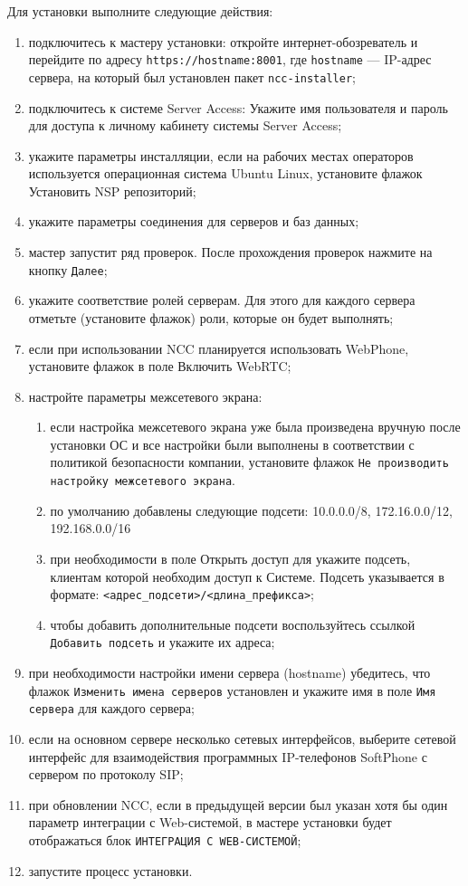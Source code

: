 Для установки выполните следующие действия:
\begin{enumerate}
    \item подключитесь к мастеру установки: откройте интернет-обозреватель и перейдите по адресу \texttt{https://hostname:8001}, где \texttt{hostname} — IP-адрес сервера, на который был установлен пакет \texttt{ncc-installer};
    \item подключитесь к системе Server Access: Укажите имя пользователя и пароль для доступа к личному кабинету системы Server Access;
    \item укажите параметры инсталляции, если на рабочих местах операторов используется операционная система Ubuntu Linux, установите флажок Установить NSP репозиторий;
    \item укажите параметры соединения для серверов и баз данных;
    \item мастер запустит ряд проверок. После прохождения проверок нажмите на кнопку \texttt{Далее};
    \item укажите соответствие ролей серверам. Для этого для каждого сервера отметьте (установите флажок) роли, которые он будет выполнять;
    \item если при использовании NCC планируется использовать WebPhone, установите флажок в поле Включить WebRTC;
    \item настройте параметры межсетевого экрана:
    \begin{enumerate}
        \item если настройка межсетевого экрана уже была произведена вручную после установки ОС и все настройки были выполнены в соответствии с политикой безопасности компании, установите флажок \texttt{Не производить настройку межсетевого экрана}.
        \item по умолчанию добавлены следующие подсети: 10.0.0.0/8, 172.16.0.0/12, 192.168.0.0/16
        \item при необходимости в поле Открыть доступ для укажите подсеть, клиентам которой необходим доступ к Системе. Подсеть указывается в формате: \verb|<адрес_подсети>/<длина_префикса>|;
        \item чтобы добавить дополнительные подсети воспользуйтесь ссылкой \texttt{Добавить подсеть} и укажите их адреса;
    \end{enumerate}
    \item при необходимости настройки имени сервера (hostname) убедитесь, что флажок \texttt{Изменить имена серверов} установлен и укажите имя в поле \texttt{Имя сервера} для каждого сервера;
    \item если на основном сервере несколько сетевых интерфейсов, выберите сетевой интерфейс для взаимодействия программных IP-телефонов SoftPhone с сервером по протоколу SIP;
    \item при обновлении NCC, если в предыдущей версии был указан хотя бы один параметр интеграции с Web-системой, в мастере установки будет отображаться блок \texttt{ИНТЕГРАЦИЯ С WEB-СИСТЕМОЙ};
    \item запустите процесс установки.
\end{enumerate}

